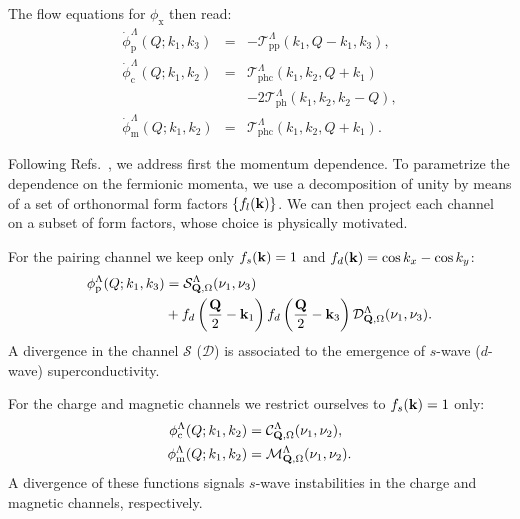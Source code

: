 The flow equations for $\phi_{\mathrm{x}}$ then read: \cite{Husemann2009}
\begin{eqnarray}
\label{eq:phi_p}
 \dot{\phi}_{\mathrm{p}}^{\Lambda}(Q;k_1,k_3) &=&
 -\mathcal{T}^{\Lambda}_{\mathrm{pp}}(k_1,Q-k_1,k_3) , \\
\label{eq:phi_c}
 \dot{\phi}_{\mathrm{c}}^{\Lambda}(Q;k_1,k_2) &=&
 \mathcal{T}^{\Lambda}_{\mathrm{phc}}(k_1,k_2,Q+k_1) \nonumber \\
 && -2\mathcal{T}^{\Lambda}_{\mathrm{ph}}(k_1,k_2,k_2-Q), \\
\label{eq:phi_m}
\dot{\phi}_{\mathrm{m}}^{\Lambda}(Q;k_1,k_2) &=& \mathcal{T}^{\Lambda}_{\mathrm{phc}}(k_1,k_2,Q+k_1) .
\end{eqnarray}
 
Following Refs.~, we address first the momentum dependence. To parametrize the dependence on the fermionic momenta, we use a decomposition of unity by means of a set of orthonormal form factors
$\{f_{l}(\mathbf{k})\}$.
We can then project each channel on a subset of form factors, whose choice is physically motivated.\cite{Husemann2009}

For the pairing channel we keep only $f_{s}(\mathbf{k}) = 1$ and $f_d(\mathbf{k})=\cos{k_x} - \cos{k_y}$:
\begin{align}
 \phi^{\Lambda}_{\mathrm{p}}(Q;k_1,k_3) &=
 \mathcal{S}^\Lambda_{\mathbf{Q},\Omega}(\nu_1,\nu_3) \nonumber \\ 
 &+ f_d\left(\frac{\mathbf{Q}}{2}-\mathbf{k}_1\right) f_d\left(\frac{\mathbf{Q}}{2}-\mathbf{k}_3\right) \mathcal{D}^\Lambda_{\mathbf{Q},\Omega}(\nu_1,\nu_3).
\end{align}
A divergence in the channel $\mathcal{S}$ ($\mathcal{D}$) is associated to the emergence of $s$-wave ($d$-wave) superconductivity.\cite{Metzner2012,Platt2013}

For the charge and magnetic channels we restrict ourselves to $f_{s}(\mathbf{k})=1$ only:
\begin{align}
  \phi^\Lambda_{\mathrm{c}}(Q;k_1,k_2) &= \mathcal{C}^\Lambda_{\mathbf{Q},\Omega}(\nu_1,\nu_2), \\
  \phi^\Lambda_{\mathrm{m}}(Q;k_1,k_2) &= \mathcal{M}^\Lambda_{\mathbf{Q},\Omega}(\nu_1,\nu_2).
\end{align}
A divergence of these functions signals $s$-wave instabilities in the charge and magnetic channels, respectively.

